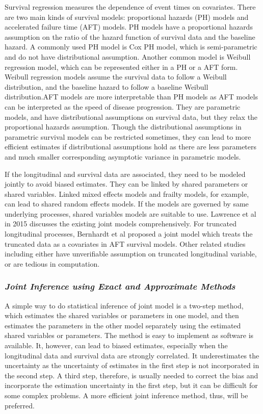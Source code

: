 Survival regression measures the dependence of event times on covariates. There are two main kinds of survival models: proportional hazards (PH) models and accelerated failure time (AFT) models. PH models have a proportional hazards assumption on the ratio of the hazard function of survival data and the baseline hazard. A commonly used PH model is Cox PH model, which is semi-parametric and do not have distributional assumption. Another common model is Weibull regression model, which can be represented either in a PH or a AFT form. Weibull regression models assume the survival data to follow a Weibull distribution, and the baseline hazard to follow a baseline Weibull distribution.AFT models are more interpretable than PH models as AFT models can be interpreted as the speed of disease progression. They are parametric models, and have distributional assumptions on survival data, but they relax the proportional hazards assumption. Though the distributional assumptions in parametric survival models can be restricted sometimes, they can lead to more efficient estimates if distributional assumptions hold as there are less parameters and much smaller corresponding asymptotic variance in parametric models.


If the longitudinal and survival data are associated, they need to be modeled jointly to avoid biased estimates. They can be linked by shared parameters or shared variables. Linked mixed effects models and frailty models, for example, can lead to shared random effects models. If the models are governed by same underlying processes, shared variables models are suitable to use. Lawrence et al in 2015 \cite{lawrence2015joint} discusses the existing joint models comprehensively. For truncated longitudinal processes, Bernhardt et al \cite{bernhardt2014flexible} proposed a joint model which treats the truncated data as a covariates in AFT survival models. Other related studies including \cite{krol2016joint,fu2017joint,barrett2015joint,elashoff2016joint} either have unverifiable assumption on truncated longitudinal variable, or are tedious in computation.


\subsubsection*{\textit{Joint Inference using Exact and Approximate Methods}}

A simple way to do statistical inference of joint model is a two-step method, which estimates the shared variables or parameters in one model, and then estimates the parameters in the other model separately using the estimated shared variables or parameters. The method is easy to implement as software is  available. It, however, can lead to biased estimates, especially when the longitudinal data and survival data are strongly correlated. It underestimates the uncertainty as the uncertainty of estimates in the first step is not incorporated in the second step. A third step, therefore, is usually needed to correct the bias and incorporate the estimation uncertainty in the first step, but it can be difficult for some complex problems. A more efficient joint inference method, thus, will be preferred.


